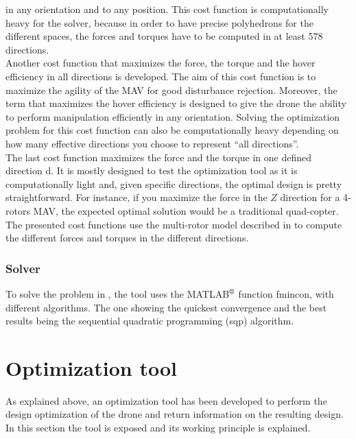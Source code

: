 in any orientation and to any position. This cost function is computationally heavy for the solver,
because in order to have precise polyhedrons for the different spaces, the forces and
torques have to be computed in at least 578 directions.\\
Another cost function that maximizes the force, the torque and the hover
efficiency in all directions is developed. The aim of this cost function
is to maximize the agility of the MAV for good disturbance rejection. Moreover,
the term that maximizes the hover efficiency is designed to give the drone
the ability to perform manipulation efficiently in any orientation. Solving the
optimization problem for this cost function can also be computationally heavy
depending on how many effective directions you choose to represent “all directions”.\\
The last cost function maximizes the force and the torque in one defined
direction d. It is mostly designed to test the optimization tool as it is
computationally light and, given specific directions, the optimal design is
pretty straightforward. For instance, if you maximize the force in the $Z$
direction for a 4-rotors MAV, the expected optimal solution would be a traditional
quad-copter.
The presented cost functions use the multi-rotor model described in
 to compute the different forces and torques in the
different directions.

\subsubsection{Solver}
\label{sec:solver}
To solve the problem in , the tool uses the
MATLAB$^\textrm{\textregistered}$ function fmincon, with different algorithms.
The one showing the quickest convergence and the best results being the sequential
quadratic programming (sqp) algorithm.

\section{Optimization tool}
\label{sec:optimization_tool}
As explained above, an optimization tool has been developed to perform
the design optimization of the drone and return information on the resulting design.
In this section the tool is exposed and its working principle is explained.
